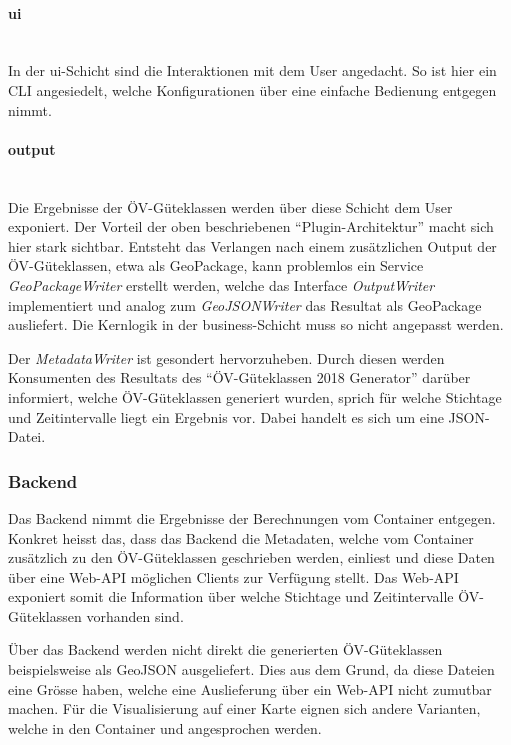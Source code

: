 \paragraph{ui}~\\
\label{layer:ui}
In der ui-Schicht sind die Interaktionen mit dem User angedacht.
So ist hier ein CLI angesiedelt, welche Konfigurationen über eine einfache Bedienung entgegen nimmt.

\paragraph{output}~\\
\label{layer:output}
Die Ergebnisse der \acs{ÖV}-Güteklassen werden über diese Schicht dem User exponiert.
Der Vorteil der oben beschriebenen "`Plugin-Architektur"' macht sich hier stark sichtbar.
Entsteht das Verlangen nach einem zusätzlichen Output der \acs{ÖV}-Güteklassen, etwa als GeoPackage, kann problemlos ein Service \emph{GeoPackageWriter} erstellt werden, welche das Interface \emph{OutputWriter} implementiert und analog zum \emph{GeoJSONWriter} das Resultat als GeoPackage ausliefert.
Die Kernlogik in der business-Schicht muss so nicht angepasst werden.

Der \emph{MetadataWriter} ist gesondert hervorzuheben.
Durch diesen werden Konsumenten des Resultats des "`\acs{ÖV}-Güteklassen 2018 Generator"' darüber informiert, welche \acs{ÖV}-Güteklassen generiert wurden, sprich für welche Stichtage und Zeitintervalle liegt ein Ergebnis vor.
Dabei handelt es sich um eine JSON-Datei.

\subsubsection{Backend}
\label{container:Backend}

Das Backend nimmt die Ergebnisse der Berechnungen vom Container  entgegen.
Konkret heisst das, dass das Backend die Metadaten, welche vom Container  zusätzlich zu den \acs{ÖV}-Güteklassen geschrieben werden, einliest und diese Daten über eine Web-\ac{API} möglichen Clients zur Verfügung stellt.
Das Web-\ac{API} exponiert somit die Information über welche Stichtage und Zeitintervalle \acs{ÖV}-Güteklassen vorhanden sind.

Über das Backend werden nicht direkt die generierten \acs{ÖV}-Güteklassen beispielsweise als GeoJSON ausgeliefert.
Dies aus dem Grund, da diese Dateien eine Grösse haben, welche eine Auslieferung über ein Web-\ac{API} nicht zumutbar machen.
Für die Visualisierung auf einer Karte eignen sich andere Varianten, welche in den Container  und  angesprochen werden.

